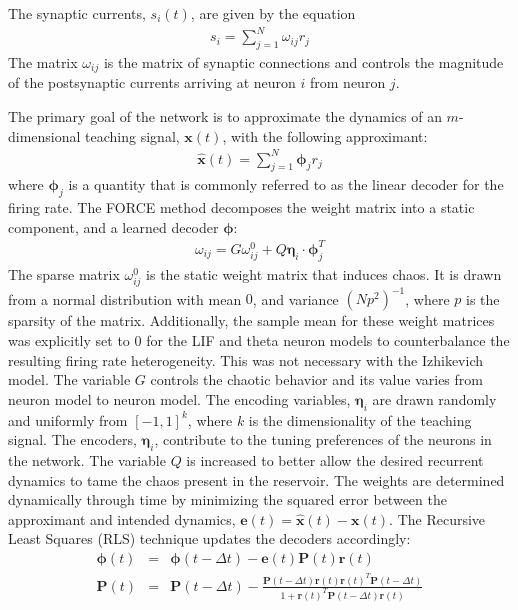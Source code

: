 \documentclass[11pt]{article} %
\begin{document}
The synaptic currents, $s_i(t)$, are given by the equation 
\begin{eqnarray}
s_i = \sum_{j=1}^N  \omega_{ij}r_j 
\end{eqnarray} 
The matrix $\omega_{ij}$ is the matrix of synaptic connections and controls 
the magnitude of the postsynaptic currents arriving at neuron $i$ from neuron $j$.  

 The primary goal of the network is to approximate the dynamics of an 
$m$-dimensional teaching signal, $\bm x(t)$, with the following approximant:
\begin{eqnarray}
\hat{\bm{x}}(t) = \sum_{j=1}^N \bm \phi_j r_j
\end{eqnarray}
where $\bm \phi_j$ is a quantity that is commonly referred to as the 
linear decoder for the firing rate.   
The FORCE method decomposes the weight matrix into a static component, 
and a learned decoder $ \bm{\phi}$:
\begin{eqnarray}
\omega_{ij} = G \omega^0_{ij} + Q \bm{\eta}_i \cdot \bm{\phi}_j  ^T
\end{eqnarray}
The sparse matrix $\omega_{ij}^0$ is the static weight matrix that induces chaos.  
It is drawn from a normal distribution with mean $0$, and variance $(Np^2)^{-1}$, 
where $p$ is the sparsity of the matrix.  Additionally, the sample mean for 
these weight matrices was explicitly set to $0$ for the LIF and theta neuron 
models to counterbalance the resulting firing rate heterogeneity.  
This was not necessary with the Izhikevich model.   
The variable $G$ controls the chaotic behavior and its value varies from 
neuron model to neuron model.   The encoding variables, $\bm \eta_i$ are 
drawn randomly and uniformly from $[-1,1]^k$, where $k$ is the dimensionality of 
the teaching signal.  The encoders, $\bm \eta_i$, contribute to the tuning 
preferences of the neurons in the network.  The variable $Q$ is increased 
to better allow the desired recurrent dynamics to tame the chaos present in the reservoir.    
The weights are determined dynamically through time by minimizing 
the squared error between the approximant and intended dynamics, 
$\bm{e}(t) = \hat{\bm{x}}(t) -\bm{x}(t)$.  
The Recursive Least Squares (RLS) technique updates the decoders accordingly:
\begin{eqnarray}
\bm{\phi}(t) &=& \bm{\phi}(t-\Delta t) - \bm{e}(t)\bm{P}(t)\bm{r}(t) \label{eq14} \\
\bm{P}(t) &=& \bm{P}(t-\Delta t) -\frac{ \bm{P}(t-\Delta t) \bm{r}(t)\bm{r}(t)^T \bm{P}(t-\Delta t)}{1 + \bm{r}(t)^T \bm{P}(t-\Delta t) \bm{r}(t)} \label{eq15}
\end{eqnarray} 
\end{document}
